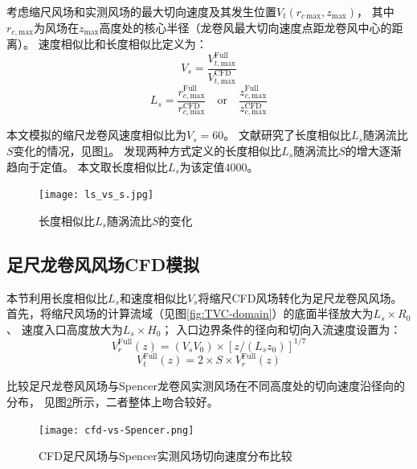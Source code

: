 考虑缩尺风场和实测风场的最大切向速度及其发生位置$V_t(r_{c\,\mathrm{max}}, z_{\mathrm{max}})$，
其中$r_{c,\mathrm{max}}$为风场在$z_{\mathrm{max}}$高度处的核心半径（龙卷风最大切向速度点距龙卷风中心的距离）。
速度相似比和长度相似比定义为\cite{hangan2008swirl}：
\begin{equation}
	V_s  =  \frac{V_{t,\mathrm{max}}^{\text{Full}}}{V_{t,\mathrm{max}}^{\text{CFD}}}
\end{equation}
\begin{equation}
	L_s  =  \frac{r_{c,\mathrm{max}}^{\text{Full}}}{r_{c,\mathrm{max}}^{\text{CFD}}} \quad \text{or} \quad \frac{z_{c,\mathrm{max}}^{\text{Full}}}{z_{c,\mathrm{max}}^{\text{CFD}}}
\end{equation}

本文模拟的缩尺龙卷风速度相似比为$V_s=60$。
文献\cite{hangan2008swirl}研究了长度相似比$L_s$随涡流比$S$变化的情况，见图\ref{fig:Ls-S}。
发现两种方式定义的长度相似比$L_s$随涡流比$S$的增大逐渐趋向于定值。
本文取长度相似比$L_s$为该定值$4000$。

\begin{figure}[!htbp]
	\centering
	\texttt{[image: ls\_vs\_s.jpg]}
	\caption{长度相似比$L_s$随涡流比$S$的变化\cite{hangan2008swirl}}
	\label{fig:Ls-S}
\end{figure}

\subsection{足尺龙卷风风场CFD模拟}\label{sec:full-tornado}

本节利用长度相似比$L_s$和速度相似比$V_s$将缩尺CFD风场转化为足尺龙卷风风场。
首先，将缩尺风场的计算流域（见图\ref{fig:TVC-domain}）的底面半径放大为$L_s\times R_0$、
速度入口高度放大为$L_s \times H_0$；
入口边界条件的径向和切向入流速度设置为：
\begin{equation}
	V_r^{\text{Full}}(z) = (V_s V_0)\times\left[z/(L_s z_0)\right]^{1/7}
\end{equation}
\begin{equation}
	V_t^{\text{Full}}(z) = 2 \times S \times V_r^{\text{Full}}(z)
\end{equation}

比较足尺龙卷风风场与Spencer龙卷风实测风场在不同高度处的切向速度沿径向的分布，
见图\ref{fig:cfd-Spencer}所示，二者整体上吻合较好。

\begin{figure}[!htbp]
	\centering
	\texttt{[image: cfd-vs-Spencer.png]}
	\caption{CFD足尺风场与Spencer实测风场切向速度分布比较}
	\label{fig:cfd-Spencer}
\end{figure}


